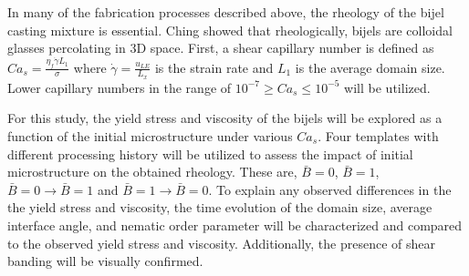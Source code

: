In many of the fabrication processes described above, the rheology of the bijel casting mixture is essential. 
\cite{haase_continuous_2015, cai_bijels_2017, amirfattahi_fabrication_2024} Ching showed that rheologically, bijels are 
colloidal glasses percolating in 3D space. \cite{ching_bijel_2022} First, a shear capillary number is defined as 
$Ca_s = \frac{\eta_{f} \dot{\gamma} L_{1}}{\sigma}$ where $\dot{\gamma} = \frac{u_{LE}}{L_x}$ is the strain rate and 
$L_1$ is the average domain size. \cite{frijters_effects_2012, yang_capillary_2022} Lower capillary numbers in the range of
 $ 10^{-7} \geq Ca_s \leq 10^{-5}$ will be utilized. 

For this study, the yield stress and viscosity of the bijels will be explored as a function of the initial microstructure under 
various $Ca_s$. Four templates with different processing history will be utilized to assess the impact of initial microstructure on 
the obtained rheology. These are, $\bar{B} = 0$, $\bar{B} = 1$, $\bar{B} = 0 \rightarrow \bar{B} = 1$ and $\bar{B} = 1 \rightarrow \bar{B} = 0$. 
To explain any observed differences in the the yield stress and viscosity, the time evolution of the domain size, average interface angle, and 
nematic order parameter will be characterized and compared to the observed yield stress and viscosity. Additionally, the presence of shear 
banding will be visually confirmed.